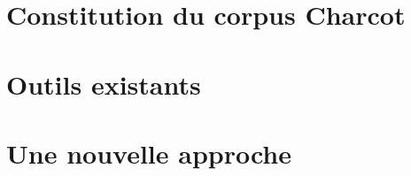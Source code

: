 \label{methodo}
\section{Constitution du corpus Charcot}

\section{Outils existants}
\section{Une nouvelle approche}

